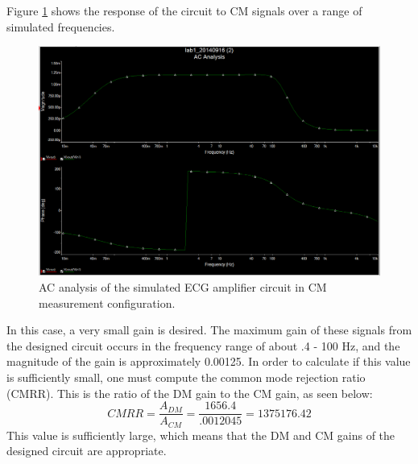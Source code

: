 \documentclass[pdftex,12pt,letterpaper]{article}
\begin{document}
Figure \ref{fig:CM} shows the response of the circuit to CM signals over a range of simulated frequencies.
\begin{figure}[H]
\begin{center}
\includegraphics[scale=.35]{CM_analysis.png}
\caption{AC analysis of the simulated ECG amplifier circuit in CM measurement configuration.}
\label{fig:CM}
\end{center}
\end{figure}
In this case, a very small gain is desired. The maximum gain of these signals from the designed circuit occurs in the frequency range of about .4 - 100 Hz, and the magnitude of the gain is approximately 0.00125. In order to calculate if this value is sufficiently small, one must compute the common mode rejection ratio (CMRR). This is the ratio of the DM gain to the CM gain, as seen below:
$$
CMRR = \frac{A_{DM}}{A_{CM}} = \frac{1656.4}{.0012045} = 1375176.42
$$
This value is sufficiently large, which means that the DM and CM gains of the designed circuit are appropriate.
\end{document}
